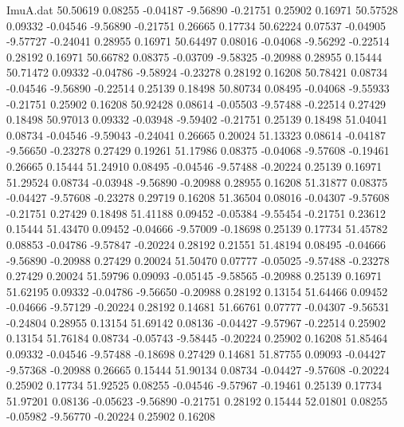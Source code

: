 \begin{filecontents}{ImuA.dat}
  50.50619    0.08255   -0.04187   -9.56890   -0.21751    0.25902    0.16971
  50.57528    0.09332   -0.04546   -9.56890   -0.21751    0.26665    0.17734
  50.62224    0.07537   -0.04905   -9.57727   -0.24041    0.28955    0.16971
  50.64497    0.08016   -0.04068   -9.56292   -0.22514    0.28192    0.16971
  50.66782    0.08375   -0.03709   -9.58325   -0.20988    0.28955    0.15444
  50.71472    0.09332   -0.04786   -9.58924   -0.23278    0.28192    0.16208
  50.78421    0.08734   -0.04546   -9.56890   -0.22514    0.25139    0.18498
  50.80734    0.08495   -0.04068   -9.55933   -0.21751    0.25902    0.16208
  50.92428    0.08614   -0.05503   -9.57488   -0.22514    0.27429    0.18498
  50.97013    0.09332   -0.03948   -9.59402   -0.21751    0.25139    0.18498
  51.04041    0.08734   -0.04546   -9.59043   -0.24041    0.26665    0.20024
  51.13323    0.08614   -0.04187   -9.56650   -0.23278    0.27429    0.19261
  51.17986    0.08375   -0.04068   -9.57608   -0.19461    0.26665    0.15444
  51.24910    0.08495   -0.04546   -9.57488   -0.20224    0.25139    0.16971
  51.29524    0.08734   -0.03948   -9.56890   -0.20988    0.28955    0.16208
  51.31877    0.08375   -0.04427   -9.57608   -0.23278    0.29719    0.16208
  51.36504    0.08016   -0.04307   -9.57608   -0.21751    0.27429    0.18498
  51.41188    0.09452   -0.05384   -9.55454   -0.21751    0.23612    0.15444
  51.43470    0.09452   -0.04666   -9.57009   -0.18698    0.25139    0.17734
  51.45782    0.08853   -0.04786   -9.57847   -0.20224    0.28192    0.21551
  51.48194    0.08495   -0.04666   -9.56890   -0.20988    0.27429    0.20024
  51.50470    0.07777   -0.05025   -9.57488   -0.23278    0.27429    0.20024
  51.59796    0.09093   -0.05145   -9.58565   -0.20988    0.25139    0.16971
  51.62195    0.09332   -0.04786   -9.56650   -0.20988    0.28192    0.13154
  51.64466    0.09452   -0.04666   -9.57129   -0.20224    0.28192    0.14681
  51.66761    0.07777   -0.04307   -9.56531   -0.24804    0.28955    0.13154
  51.69142    0.08136   -0.04427   -9.57967   -0.22514    0.25902    0.13154
  51.76184    0.08734   -0.05743   -9.58445   -0.20224    0.25902    0.16208
  51.85464    0.09332   -0.04546   -9.57488   -0.18698    0.27429    0.14681
  51.87755    0.09093   -0.04427   -9.57368   -0.20988    0.26665    0.15444
  51.90134    0.08734   -0.04427   -9.57608   -0.20224    0.25902    0.17734
  51.92525    0.08255   -0.04546   -9.57967   -0.19461    0.25139    0.17734
  51.97201    0.08136   -0.05623   -9.56890   -0.21751    0.28192    0.15444
  52.01801    0.08255   -0.05982   -9.56770   -0.20224    0.25902    0.16208

\end{filecontents}
